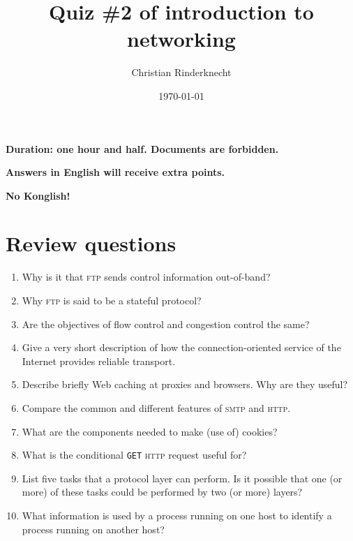 \documentclass[11pt,a4paper]{article}
\title{Quiz \#2 of introduction to networking}
\author{Christian Rinderknecht}
\date{\today}
\begin{document}
\maketitle

\begin{center}
\textbf{Duration: one hour and half. Documents are forbidden.}

\textbf{Answers in English will receive extra points.}

\textbf{No Konglish!}
\end{center}


\section{Review questions}

\begin{enumerate}

  \item Why is it that \textsc{ftp} sends control information
    out-of-band?

  \item Why \textsc{ftp} is said to be a stateful protocol?

  \item Are the objectives of flow control and congestion control the
    same?

  \item Give a very short description of how the connection-oriented
    service of the Internet provides reliable transport.

  \item Describe briefly Web caching at proxies and browsers. Why are
    they useful?

  \item Compare the common and different features of \textsc{smtp} and
    \textsc{http}.

  \item What are the components needed to make (use of) cookies?

  \item What is the conditional \texttt{GET} \textsc{http} request
    useful for?

  \item List five tasks that a protocol layer can perform. Is it
    possible that one (or more) of these tasks could be performed by
    two (or more) layers?

  \item What information is used by a process running on one host to
    identify a process running on another host?

\end{enumerate}
\end{document}

